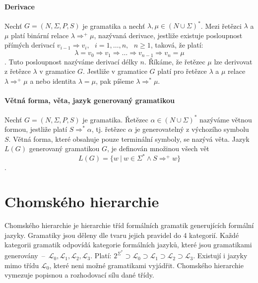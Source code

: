 \paragraph*{Derivace} Nechť $G = (N, \Sigma, P, S)$ je gramatika a nechť $\lambda, \mu \in (N \cup \Sigma)^*$. Mezi řetězci $\lambda$ a $\mu$ platí binární relace $\lambda \Rightarrow^+ \mu$, nazývaná derivace, jestliže existuje posloupnost přímých derivací $v_{i-1} \Rightarrow v_i,~~~ i=1, \dots, n,~~~ n \geq 1$, taková, že platí: $$\lambda = v_0 \Rightarrow v_1 \Rightarrow \dots \Rightarrow v_{n-1} \Rightarrow v_n = \mu$$. Tuto posloupnost nazýváme derivací délky $n$. Říkáme, že řetězec $\mu$ lze derivovat z řetězce $\lambda$ v gramatice $G$. Jestliže v gramatice $G$ platí pro řetězce $\lambda$ a $\mu$ relace $\lambda \Rightarrow^+ \mu$ a nebo identita $\lambda = \mu$, pak píšeme $\lambda \Rightarrow^* \mu$.

\paragraph*{Větná forma, věta, jazyk generovaný gramatikou} Nechť $G = (N, \Sigma, P, S)$ je gramatika. Řetězec $\alpha \in (N \cup \Sigma)^*$ nazýváme větnou formou, jestliže platí $S \Rightarrow^* \alpha$, tj. řetězec $\alpha$ je generovatelný z výchozího symbolu $S$. Větná forma, které obsahuje pouze terminální symboly, se nazývá věta. Jazyk $L(G)$ generovaný gramatikou $G$, je definován množinou všech vět $$L(G) = \{ w ~|~ w \in \Sigma^* \land S \Rightarrow^+ w \}$$.


\section{Chomského hierarchie}

Chomského hierarchie je hierarchie tříd formálních gramatik generujících formální jazyky. Gramatiky jsou děleny dle tvaru jejich pravidel do 4 kategorií. Každé kategorii gramatik odpovídá kategorie formálních jazyků, které jsou gramatikami generovány~--~$\mathcal{L}_0, \mathcal{L}_1, \mathcal{L}_2, \mathcal{L}_3$. Platí: $2^{\Sigma^*} \supset \mathcal{L}_0 \supset \mathcal{L}_1 \supset \mathcal{L}_2 \supset \mathcal{L}_3$. Existují i jazyky mimo třídu $\mathcal{L}_0$, které neni možné gramatikami vyjádřit. Chomského hierarchie vymezuje popisnou a rozhodovací sílu dané třídy.

